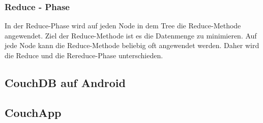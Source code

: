 \subsubsection{Reduce - Phase}

In der Reduce-Phase wird auf jeden Node in dem Tree die Reduce-Methode angewendet. Ziel der Reduce-Methode ist es die Datenmenge zu minimieren. Auf jede Node kann die Reduce-Methode beliebig oft angewendet werden. Daher wird die Reduce und die Rereduce-Phase unterschieden.

\subsection{CouchDB auf Android}

\subsection{CouchApp}

